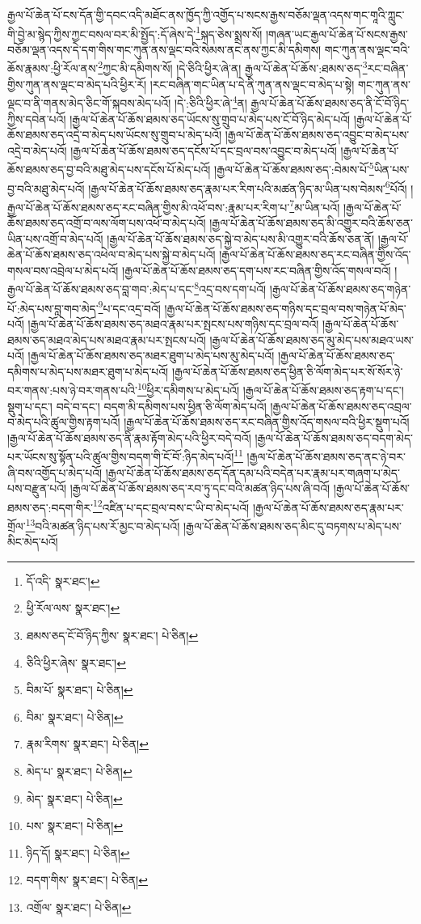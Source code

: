 རྒྱལ་པོ་ཆེན་པོ་ངས་དོན་གྱི་དབང་འདི་མཐོང་ནས་ཁྱོད་ཀྱི་འགྱོད་པ་སངས་རྒྱས་བཅོམ་ལྡན་འདས་གང་གཱའི་ཀླུང་གི་བྱེ་མ་སྙེད་ཀྱིས་ཀྱང་བསལ་བར་མི་སྤྱོད་:དོ་ཞེས་དེ་\footnote{དོ་འདི་  སྣར་ཐང་། }སྐད་ཅེས་སྨྲས་སོ། །གཞན་ཡང་རྒྱལ་པོ་ཆེན་པོ་སངས་རྒྱས་བཅོམ་ལྡན་འདས་དེ་དག་གིས་གང་ཀུན་ནས་ལྡང་བའི་སེམས་ནང་ནས་ཀྱང་མི་དམིགས། གང་ཀུན་ནས་ལྡང་བའི་ཆོས་རྣམས་:ཕྱི་རོལ་ནས་\footnote{ཕྱི་རོལ་ལས་  སྣར་ཐང་། }ཀྱང་མི་དམིགས་སོ། །དེ་ཅིའི་ཕྱིར་ཞེ་ན། རྒྱལ་པོ་ཆེན་པོ་ཆོས་:ཐམས་ཅད་\footnote{ཐམས་ཅད་ངོ་བོ་ཉིད་ཀྱིས་  སྣར་ཐང་།  པེ་ཅིན། }རང་བཞིན་གྱིས་ཀུན་ནས་ལྡང་བ་མེད་པའི་ཕྱིར་རོ། །རང་བཞིན་གང་ཡིན་པ་དེ་ནི་ཀུན་ནས་ལྡང་བ་མེད་པ་སྟེ། གང་ཀུན་ནས་ལྡང་བ་ནི་གནས་མེད་ཅིང་གོ་སྐབས་མེད་པའོ། །དེ་:ཅིའི་ཕྱིར་ཞེ་\footnote{ཅིའི་ཕྱིར་ཞེས་  སྣར་ཐང་། }ན། རྒྱལ་པོ་ཆེན་པོ་ཆོས་ཐམས་ཅད་ནི་ངོ་བོ་ཉིད་ཀྱིས་དབེན་པའོ། །རྒྱལ་པོ་ཆེན་པོ་ཆོས་ཐམས་ཅད་ཡོངས་སུ་གྲུབ་པ་མེད་པས་ངོ་བོ་ཉིད་མེད་པའོ། །རྒྱལ་པོ་ཆེན་པོ་ཆོས་ཐམས་ཅད་འདྲེ་བ་མེད་པས་ཡོངས་སུ་གྲུབ་པ་མེད་པའོ། །རྒྱལ་པོ་ཆེན་པོ་ཆོས་ཐམས་ཅད་འབྱུང་བ་མེད་པས་འདྲེ་བ་མེད་པའོ། །རྒྱལ་པོ་ཆེན་པོ་ཆོས་ཐམས་ཅད་དངོས་པོ་དང་བྲལ་བས་འབྱུང་བ་མེད་པའོ། །རྒྱལ་པོ་ཆེན་པོ་ཆོས་ཐམས་ཅད་བྱ་བའི་མཐུ་མེད་པས་དངོས་པོ་མེད་པའོ། །རྒྱལ་པོ་ཆེན་པོ་ཆོས་ཐམས་ཅད་:བེམས་པོ་\footnote{བིམ་པོ་  སྣར་ཐང་།  པེ་ཅིན། }ཡིན་པས་བྱ་བའི་མཐུ་མེད་པའོ། །རྒྱལ་པོ་ཆེན་པོ་ཆོས་ཐམས་ཅད་རྣམ་པར་རིག་པའི་མཚན་ཉིད་མ་ཡིན་པས་བེམས་\footnote{བིམ་  སྣར་ཐང་།  པེ་ཅིན། }པོའོ། །རྒྱལ་པོ་ཆེན་པོ་ཆོས་ཐམས་ཅད་རང་བཞིན་གྱིས་མི་འཕོ་བས་:རྣམ་པར་རིག་པ་\footnote{རྣམ་རིགས་  སྣར་ཐང་།  པེ་ཅིན། }མ་ཡིན་པའོ། །རྒྱལ་པོ་ཆེན་པོ་ཆོས་ཐམས་ཅད་འགྲོ་བ་ལས་ལོག་པས་འཕོ་བ་མེད་པའོ། །རྒྱལ་པོ་ཆེན་པོ་ཆོས་ཐམས་ཅད་མི་འགྱུར་བའི་ཆོས་ཅན་ཡིན་པས་འགྲོ་བ་མེད་པའོ། །རྒྱལ་པོ་ཆེན་པོ་ཆོས་ཐམས་ཅད་སྐྱེ་བ་མེད་པས་མི་འགྱུར་བའི་ཆོས་ཅན་ནོ། །རྒྱལ་པོ་ཆེན་པོ་ཆོས་ཐམས་ཅད་འཕེལ་བ་མེད་པས་སྐྱེ་བ་མེད་པའོ། །རྒྱལ་པོ་ཆེན་པོ་ཆོས་ཐམས་ཅད་རང་བཞིན་གྱིས་འོད་གསལ་བས་འབྲེལ་པ་མེད་པའོ། །རྒྱལ་པོ་ཆེན་པོ་ཆོས་ཐམས་ཅད་དག་པས་རང་བཞིན་གྱིས་འོད་གསལ་བའོ། །རྒྱལ་པོ་ཆེན་པོ་ཆོས་ཐམས་ཅད་བླ་གབ་:མེད་པ་དང་\footnote{མེད་པ་  སྣར་ཐང་།  པེ་ཅིན། }འདྲ་བས་དག་པའོ། །རྒྱལ་པོ་ཆེན་པོ་ཆོས་ཐམས་ཅད་གཉེན་པོ་:མེད་པས་བླ་གབ་མེད་\footnote{མེད་  སྣར་ཐང་།  པེ་ཅིན། }པ་དང་འདྲ་བའོ། །རྒྱལ་པོ་ཆེན་པོ་ཆོས་ཐམས་ཅད་གཉིས་དང་བྲལ་བས་གཉེན་པོ་མེད་པའོ། །རྒྱལ་པོ་ཆེན་པོ་ཆོས་ཐམས་ཅད་མཐའ་རྣམ་པར་སྤངས་པས་གཉིས་དང་བྲལ་བའོ། །རྒྱལ་པོ་ཆེན་པོ་ཆོས་ཐམས་ཅད་མཐའ་མེད་པས་མཐའ་རྣམ་པར་སྤངས་པའོ། །རྒྱལ་པོ་ཆེན་པོ་ཆོས་ཐམས་ཅད་མུ་མེད་པས་མཐའ་ཡས་པའོ། །རྒྱལ་པོ་ཆེན་པོ་ཆོས་ཐམས་ཅད་མཐར་ཐུག་པ་མེད་པས་མུ་མེད་པའོ། །རྒྱལ་པོ་ཆེན་པོ་ཆོས་ཐམས་ཅད་དམིགས་པ་མེད་པས་མཐར་ཐུག་པ་མེད་པའོ། །རྒྱལ་པོ་ཆེན་པོ་ཆོས་ཐམས་ཅད་ཕྱིན་ཅི་ལོག་མེད་པར་སོ་སོར་ཉེ་བར་གནས་:པས་ཉེ་བར་གནས་པའི་\footnote{པས་  སྣར་ཐང་།  པེ་ཅིན། }ཕྱིར་དམིགས་པ་མེད་པའོ། །རྒྱལ་པོ་ཆེན་པོ་ཆོས་ཐམས་ཅད་རྟག་པ་དང་། སྡུག་པ་དང་། བདེ་བ་དང་། བདག་མི་དམིགས་པས་ཕྱིན་ཅི་ལོག་མེད་པའོ། །རྒྱལ་པོ་ཆེན་པོ་ཆོས་ཐམས་ཅད་འབྲལ་བ་མེད་པའི་ཚུལ་གྱིས་རྟག་པའོ། །རྒྱལ་པོ་ཆེན་པོ་ཆོས་ཐམས་ཅད་རང་བཞིན་གྱིས་འོད་གསལ་བའི་ཕྱིར་སྡུག་པའོ། །རྒྱལ་པོ་ཆེན་པོ་ཆོས་ཐམས་ཅད་ནི་རྣམ་རྟོག་མེད་པའི་ཕྱིར་བདེ་བའོ། །རྒྱལ་པོ་ཆེན་པོ་ཆོས་ཐམས་ཅད་བདག་མེད་པར་ཡོངས་སུ་སྟོན་པའི་ཚུལ་གྱིས་བདག་གི་ངོ་བོ་:ཉིད་མེད་པའོ།\footnote{ཉིད་དོ།  སྣར་ཐང་།  པེ་ཅིན། } །རྒྱལ་པོ་ཆེན་པོ་ཆོས་ཐམས་ཅད་ནང་ཉེ་བར་ཞི་བས་འགྱོད་པ་མེད་པའོ། །རྒྱལ་པོ་ཆེན་པོ་ཆོས་ཐམས་ཅད་དོན་དམ་པའི་བདེན་པར་རྣམ་པར་གཞག་པ་མེད་པས་བརྫུན་པའོ། །རྒྱལ་པོ་ཆེན་པོ་ཆོས་ཐམས་ཅད་རབ་ཏུ་དང་བའི་མཚན་ཉིད་པས་ཞི་བའོ། །རྒྱལ་པོ་ཆེན་པོ་ཆོས་ཐམས་ཅད་:བདག་གིར་\footnote{བདག་གིས་  སྣར་ཐང་།  པེ་ཅིན། }འཛིན་པ་དང་བྲལ་བས་ང་ཡི་བ་མེད་པའོ། །རྒྱལ་པོ་ཆེན་པོ་ཆོས་ཐམས་ཅད་རྣམ་པར་གྲོལ་\footnote{འགྲོལ་  སྣར་ཐང་།  པེ་ཅིན། }བའི་མཚན་ཉིད་པས་རོ་མྱང་བ་མེད་པའོ། །རྒྱལ་པོ་ཆེན་པོ་ཆོས་ཐམས་ཅད་མིང་དུ་བཏགས་པ་མེད་པས་མིང་མེད་པའོ། 